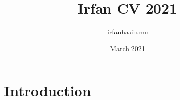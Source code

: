\documentclass{article}
\title{Irfan CV 2021}
\author{irfanhasib.me }
\date{March 2021}
\begin{document}
\maketitle

\section{Introduction}
\end{document}
